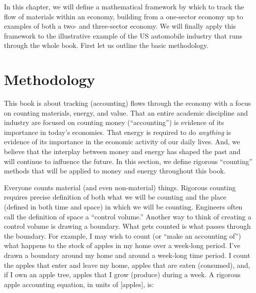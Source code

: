 In this chapter, we will define a mathematical framework by which to track the flow of
materials within an economy, building from a one-sector economy up to examples of both a
two- and three-sector economy. We will finally apply this framework to the illustrative
example of the US automobile industry that runs through the whole book. First let us
outline the basic methodology.

\section{Methodology}
\label{sec:Materials_Methodology}



This book is about tracking (accounting) flows through the 
economy with a focus on counting materials, energy, and value.
That an entire academic discipline and industry are focused on counting money (``accounting'')
is evidence of its importance in today's economies.
That energy is required to do \emph{anything} is evidence 
of its importance in the economic activity of our daily lives.
And, we believe that the interplay between money and energy
has shaped the past and will continue to influence the future.
In this section, we define rigorous ``counting'' methods that will be applied
to money and energy throughout this book.

Everyone counts material (and even non-material) things. 
Rigorous counting requires precise definition of both 
what we will be counting
and the place (defined in both time and space) in which we will be counting. 
Engineers often call the definition of space a ``control volume.'' 
Another way to think of creating a
control volume is drawing a boundary. What gets counted is 
what passes through the boundary.
For example, I may wish to count (or ``make an accounting of'') 
what happens to the stock of apples in my home over a week-long period. 
I've drawn a boundary around my home and around a week-long time period.
I  count the apples that enter and leave my home, 
apples that are eaten (consumed),
and, if I own an apple tree, apples that I grow (produce) during a week. 
A rigorous apple accounting equation, in units of [apples], is:

